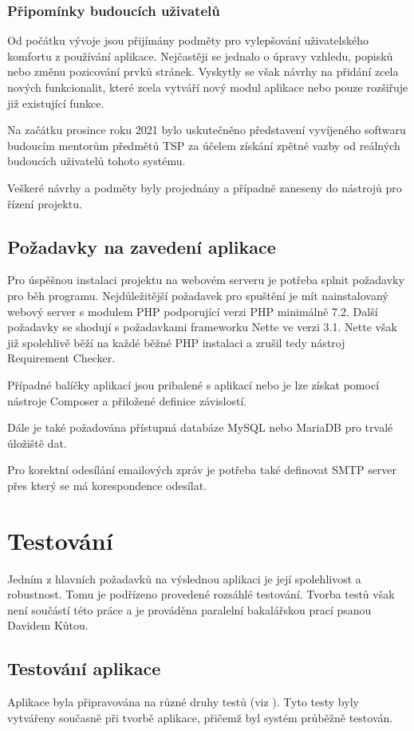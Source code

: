 \documentclass[czech,BP]{thesiskiv}
\begin{document}
	\subsection{Připomínky budoucích uživatelů}
	\par Od počátku vývoje jsou přijímány podměty pro vylepšování uživatelského komfortu z používání aplikace. Nejčastěji se jednalo o úpravy vzhledu, popisků nebo změnu pozicování prvků stránek. Vyskytly se však návrhy na přidání zcela nových funkcionalit, které zcela vytváří nový modul aplikace nebo pouze rozšiřuje již existující funkce.
	\par Na začátku prosince roku 2021 bylo uskutečněno představení vyvíjeného softwaru budoucím mentorům předmětů TSP za účelem získání zpětné vazby od reálných budoucích uživatelů tohoto systému.
	\par Veškeré návrhy a podměty byly projednány a případně zaneseny do nástrojů pro řízení projektu.
	\section{Požadavky na zavedení aplikace}
	\par Pro úspěšnou instalaci projektu na webovém serveru je potřeba splnit požadavky pro běh programu. Nejdůležitější požadavek pro spuštění je mít nainstalovaný webový server s modulem PHP podporující verzi PHP minimálně 7.2. Další požadavky se shodují s požadavkami frameworku Nette ve verzi 3.1. Nette však již spolehlivě běží na každé běžné PHP instalaci a zrušil tedy nástroj Requirement Checker.
	\par Případné balíčky aplikací jsou pribalené s aplikací nebo je lze získat pomocí nástroje Composer a přiložené definice závislostí.
	\par Dále je také požadována přístupná databáze MySQL nebo MariaDB pro trvalé úložiště dat.
	\par Pro korektní odesílání emailových zpráv je potřeba také definovat SMTP server přes který se má korespondence odesílat.
\chapter{Testování}
	\par Jedním z hlavních požadavků na výslednou aplikaci je její spolehlivost a robustnost. Tomu je podřízeno provedené rozsáhlé testování. Tvorba testů však není součástí této práce a je prováděna paralelní bakalářskou prací  psanou Davidem Kůtou.
	\section{Testování aplikace}
	\par Aplikace byla připravována na různé druhy testů (viz ). Tyto testy byly vytvářeny současně při tvorbě aplikace, přičemž byl systém průběžně testován.
\end{document}
